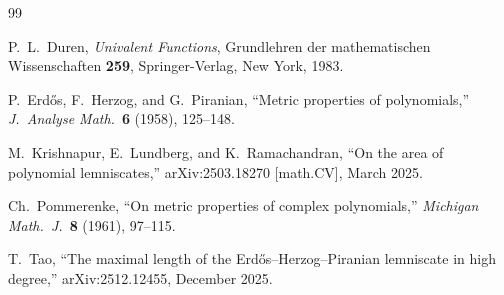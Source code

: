 \documentclass[11pt,a4paper]{amsart}
\theoremstyle{definition}
\begin{document}

\begin{thebibliography}{99}

P.~L.~Duren, \emph{Univalent Functions},
Grundlehren der mathematischen Wissenschaften \textbf{259},
Springer-Verlag, New York, 1983.

P.~Erd\H{o}s, F.~Herzog, and G.~Piranian,
``Metric properties of polynomials,''
\emph{J.\ Analyse Math.}\ \textbf{6} (1958), 125--148.

M.~Krishnapur, E.~Lundberg, and K.~Ramachandran,
``On the area of polynomial lemniscates,''
arXiv:2503.18270 [math.CV], March 2025.

Ch.~Pommerenke,
``On metric properties of complex polynomials,''
\emph{Michigan Math.\ J.}\ \textbf{8} (1961), 97--115.

T.~Tao,
``The maximal length of the Erd\H{o}s--Herzog--Piranian lemniscate in high degree,''
arXiv:2512.12455, December 2025.

\end{thebibliography}
\end{document}
